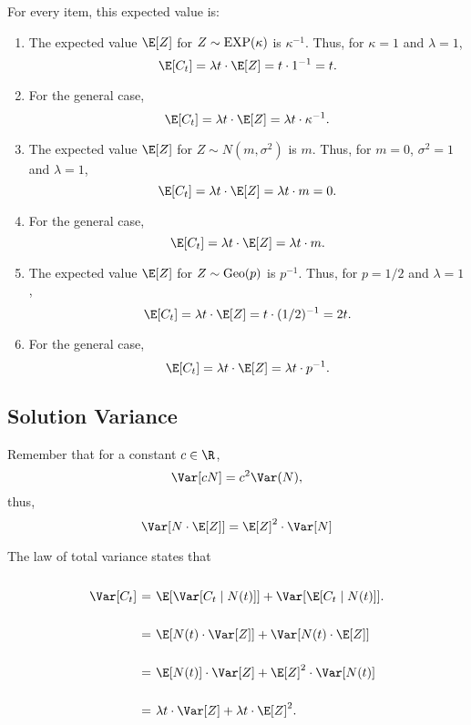 For every item, this expected value is:
\begin{enumerate}[label=(\alph*)]
    \item The expected value $\E[Z]$ for $Z \sim \hbox{EXP}(\kappa)$ is $\kappa^{-1}$. Thus, for $\kappa = 1$ and $\lambda = 1$,
    \[ \E[C_t] = \lambda t \cdot \E[Z] = t \cdot 1^{-1} = t. \]

    \item For the general case,
    \[ \E[C_t] = \lambda t  \cdot  \E[Z] = \lambda t\cdot \kappa^{-1}. \]

    \item The expected value $\E[Z]$ for $Z \sim N(m,\sigma^2)$ is $m$. Thus, for $m = 0$, $\sigma^2 = 1$ and $\lambda = 1$,
    \[ \E[C_t] = \lambda t  \cdot  \E[Z] = \lambda t\cdot m = 0. \]

    \item For the general case,
    \[ \E[C_t] = \lambda t  \cdot  \E[Z] = \lambda t\cdot m. \]

    \item The expected value $\E[Z]$ for $Z \sim \hbox{Geo}(p)$ is $p^{-1}$. Thus, for $p = 1/2$ and $\lambda = 1$,
    \[ \E[C_t] = \lambda t  \cdot  \E[Z] = t \cdot (1/2)^{-1} = 2 t. \]

    \item For the general case,
    \[ \E[C_t] = \lambda t  \cdot  \E[Z] = \lambda t\cdot p^{-1}. \]
\end{enumerate}


\subsection*{Solution Variance}
Remember that for a constant $c\in\R$,
\[ \Var[cN] = c^2 \Var(N), \]
thus,
\[ \Var[N \cdot \E[Z]] = \E[Z]^2 \cdot \Var[N]  \]

The law of total variance states that
\[ \everymath{\displaystyle}
\arraycolsep=1.8pt\def\arraystretch{2.5}
\begin{array}{rcl}
    \Var[C_t] & = & \E[\Var[C_t\;|\; N(t)]] + \Var[\E[C_t\;|\; N(t)]].\\
    & = & \E[N(t) \cdot\Var[Z]] + \Var[N(t) \cdot\E[Z]]\\
    & = & \E[N(t)] \cdot \Var[Z] +  \E[Z]^2 \cdot \Var[N(t)]\\
    & = & \lambda t \cdot \Var[Z] + \lambda t  \cdot  \E[Z]^2.
\end{array}\]

